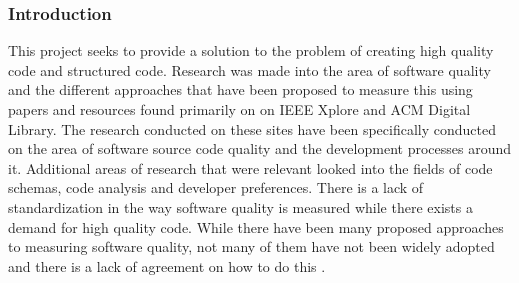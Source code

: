 \subsubsection{Introduction} %
This project seeks to provide a solution to the problem of creating high quality code and structured code. Research was made into the area of software quality and the different approaches that have been proposed to measure this using papers and resources found primarily on on IEEE Xplore and ACM Digital Library. The research conducted on these sites have been specifically conducted on the area of software source code quality and the development processes around it. Additional areas of research that were relevant looked into the fields of code schemas, code analysis and developer preferences. 
There is a lack of standardization in the way software quality is measured while there exists a demand for high quality code. While there have been many proposed approaches to measuring software quality, not many of them have not been widely adopted and there is a lack of agreement on how to do this \citep{6606742}.
